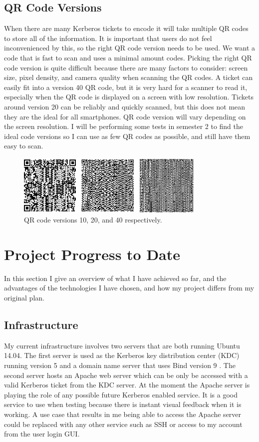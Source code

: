 \documentclass[]{report}   %
\begin{document}
\subsection{QR Code Versions}
When there are many Kerberos tickets to encode it will take multiple QR codes to store all of the information. It is important that users do not feel inconvenienced by this, so the right QR code version needs to be used. We want a code that is fast to scan and uses a minimal amount codes. Picking the right QR code version is quite difficult because there are many factors to consider: screen size, pixel density, and camera quality when scanning the QR codes. A ticket can easily fit into a version 40 QR code, but it is very hard for a scanner to read it, especially when the QR code is displayed on a screen with low resolution. Tickets around version 20 can be reliably and quickly scanned, but this does not mean they are the ideal for all smartphones. QR code version will vary depending on the screen resolution. I will be performing some tests in semester 2 to find the ideal code versions so I can use as few QR codes as possible, and still have them easy to scan.

\begin{figure}[H]
\centering
\includegraphics[width=9cm]{QRCodes.png}
\caption{QR code versions 10, 20, and 40 respectively.}
\end{figure}

\section{Project Progress to Date}
In this section I give an overview of what I have achieved so far, and the advantages of the technologies I have chosen, and how my project differs from my original plan.

\subsection{Infrastructure} 
My current infrastructure involves two servers that are both running Ubuntu 14.04. The first server is used as the Kerberos key distribution center (KDC) running version 5 and a domain name server that uses Bind version 9 \cite{Bind}. The second server hosts an Apache web server which can be only be accessed with a valid Kerberos ticket from the KDC server. At the moment the Apache server is playing the role of any possible future Kerberos enabled service. It is a good service to use when testing because there is instant visual feedback when it is working. A use case that results in me being able to access the Apache server could be replaced with any other service such as SSH or access to my account from the user login GUI.
\end{document}
